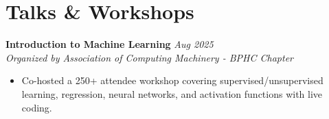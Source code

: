 \documentclass[10pt,letterpaper]{article}
\newcommand{\head}[2]{{\bfseries #1} \hfill {\itshape #2}\\}
\newcommand{\subline}[1]{{\itshape #1}\\[2pt]}
\begin{document}
\section*{Talks \& Workshops}
\head{Introduction to Machine Learning}{Aug 2025}
\subline{Organized by Association of Computing Machinery - BPHC Chapter}
\vspace{-8pt}
\begin{itemize}
\item Co-hosted a 250+ attendee workshop covering supervised/unsupervised learning, regression, neural networks, and activation functions with live coding.
\end{itemize}
\par\vspace{9pt}
\end{document}
